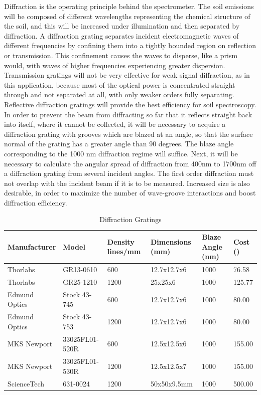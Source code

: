 Diffraction is the operating principle behind the spectrometer. The soil emissions will be composed of different wavelengths representing the chemical structure of the soil, and this will be increased under illumination and then separated by diffraction. A diffraction grating separates incident electromagnetic waves of different frequencies by confining them into a tightly bounded region on reflection or transmission. This confinement causes the waves to disperse, like a prism would, with waves of higher frequencies experiencing greater dispersion. Transmission gratings will not be very effective for weak signal diffraction, as in this application, because most of the optical power is concentrated straight through and not separated at all, with only weaker orders fully separating. Reflective diffraction gratings will provide the best efficiency for soil spectroscopy. In order to prevent the beam from diffracting so far that it reflects straight back into itself, where it cannot be collected, it will be necessary to acquire a diffraction grating with grooves which are blazed at an angle, so that the surface normal of the grating has a greater angle than 90 degrees. The blaze angle corresponding to the 1000 nm diffraction regime will suffice. Next, it will be necessary to calculate the angular spread of diffraction from 400nm to 1700nm off a diffraction grating from several incident angles. The first order diffraction must not overlap with the incident beam if it is to be measured. Increased size is also desirable, in order to maximize the number of wave-groove interactions and boost diffraction efficiency. 

\begin{table}[H]
	\centering
	\label{table:DiffractionGratings}
	\caption{Diffraction Gratings}
	\bigskip
	\begin{tabular}{|p{3cm}|p{2.5cm}|p{1.75cm}|p{2.25cm}|p{1.5cm}|p{1cm}|}
	\hline
	Manufacturer & Model & Density lines/mm & Dimensions (mm) & Blaze Angle (nm) & Cost (\textdollar)\\
	\hline
	Thorlabs & GR13-0610 & 600 & 12.7x12.7x6 & 1000 & 76.58\\
	\hline
	Thorlabs & GR25-1210 & 1200 & 25x25x6 & 1000 & 125.77\\
	\hline
	Edmund Optics & Stock 43-745 & 600 & 12.7x12.7x6 & 1000 & 80.00\\
	\hline
	Edmund Optics & Stock 43-753 & 1200 & 12.7x12.7x6 & 1000 & 80.00\\
	\hline
	MKS Newport & 33025FL01-520R & 600 & 12.5x12.5x6 & 1000 & 155.00\\
	\hline
	MKS Newport & 33025FL01-530R & 1200 & 12.5x12.5x7 & 1000 & 155.00\\
	\hline
	ScienceTech	& 631-0024 & 1200 & 50x50x9.5mm & 1000 & 500.00\\
	\hline
	\end{tabular}
\end{table}

